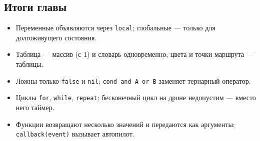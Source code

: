 \subsection*{Итоги главы}
\begin{itemize}
    \item Переменные объявляются через \verb|local|; глобальные --- только для долгоживущего состояния.
    \item Таблица --- массив (с 1) и словарь одновременно; цвета и точки маршрута --- таблицы.
    \item Ложны только \verb|false| и \verb|nil|; \verb|cond and A or B| заменяет тернарный оператор.
    \item Циклы \verb|for|, \verb|while|, \verb|repeat|; бесконечный цикл на дроне недопустим --- вместо него таймер.
    \item Функции возвращают несколько значений и передаются как аргументы; \verb|callback(event)| вызывает автопилот.
\end{itemize}
